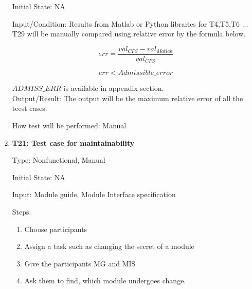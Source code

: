 \documentclass[12pt, titlepage]{article}
\begin{document}
\begin{enumerate}
Initial State: NA
					
Input/Condition: Results from Matlab or Python libraries for T4,T5,T6 ... T29 
will be manually compared using relative error by the formula below. 

\begin{equation*}
err = \frac{val_{CFS} - val_{Matlab}}{val_{CFS}}
\end{equation*}

\begin{equation*}
err < Admissible\_error
\end{equation*}


$ADMISS\_ERR$ is available in appendix section.  \\
				
Output/Result: The output will be the maximum relative error of all the teest 
cases.
					
How test will be performed: Manual
				

				
\item{\textbf{T21: Test case for maintainability}\\}

Type: Nonfunctional, Manual
					
Initial State: NA
					
Input: Module guide, Module Interface specification

Steps: 
\begin{enumerate}
	\item Choose participants
	\item Assign a task such as changing the secret of a module
	\item Give the participants MG and MIS
	\item Ask them to find, which module undergoes change.
\end{enumerate}


\end{enumerate}
\end{document}
